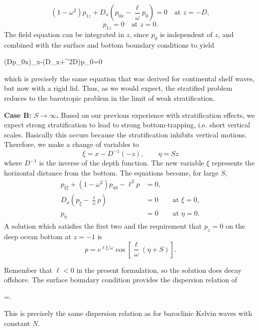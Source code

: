 \sourcepagebreak

\[
	(1-\omega^2)p_{1z}
	+D_x\left(p_{0x}-\frac{\ell}{\omega}p_0\right)=0
	\quad\text{at }z=-D,
\]
\[
	p_{1z}=0\quad\text{at }z=0.
\]
The field equation can be integrated in $z$, since $p_0$ is independent of $z$, and
combined with the surface and bottom boundary conditions to yield
\begin{waveequation}
	(Dp_{0x})_x-\left(\frac{\ell}{\omega}D_x+\ell^2D\right)p_0=0
\end{waveequation}
which is precisely the same equation that was derived for continental shelf waves, but
now with a rigid lid. Thus, as we would expect, the stratified problem reduces to the
barotropic problem in the limit of weak stratification.

\noindent\textbf{Case B: $S\to\infty$.} Based on our previous experience with
stratification effects, we expect strong stratification to lead to strong bottom-trapping,
i.e. short vertical scales. Basically this occurs because the stratification inhibits
vertical motions. Therefore, we make a change of variables to
\[
	\xi=x-D^{-1}(-z),
	\qquad
	\eta=Sz
\]
where $D^{-1}$ is the inverse of the depth function. The new variable $\xi$ represents
the horizontal distance from the bottom. The equations become, for large $S$,
\begin{align*}
	p_{\xi\xi}+(1-\omega^2)p_{\eta\eta}-\ell^2p & =0,                        \\
	D_x\left(p_\xi-\frac{\ell}{\omega}p\right)  & =0  &  & \text{at }\xi=0,  \\
	p_\eta                                      & =0  &  & \text{at }\eta=0.
\end{align*}
A solution which satisfies the first two and the requirement that $p_z=0$ on the deep
ocean bottom at $z=-1$ is
\[
	p=e^{\ell\xi/\omega}
	\cos\left[\frac{\ell}{\omega}(\eta+S)\right].
\]

\sourcepagebreak

Remember that $\ell<0$ in the present formulation, so the solution does decay offshore.
The surface boundary condition provides the dispersion relation of
\begin{waveequation}
	\omega=.
\end{waveequation}
This is precisely the same dispersion relation as for baroclinic Kelvin waves with
constant $N$.

